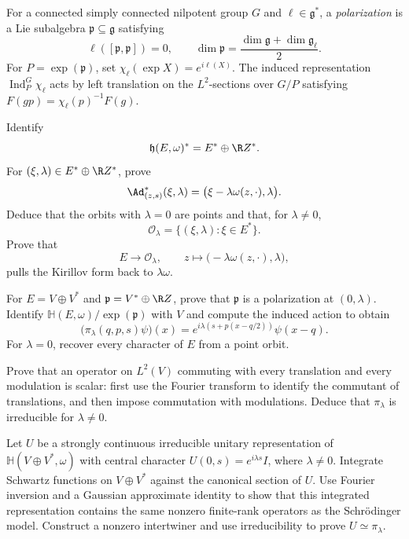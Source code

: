 \begin{exercise}
For a connected simply connected nilpotent group $G$ and
$\ell\in\mathfrak g^*$, a \emph{polarization} is a Lie subalgebra
$\mathfrak p\subseteq\mathfrak g$ satisfying
\[
\ell([\mathfrak p,\mathfrak p])=0,
\qquad
\dim\mathfrak p
=\frac{\dim\mathfrak g+\dim\mathfrak g_\ell}{2}.
\]
For $P=\exp(\mathfrak p)$, set
$\chi_\ell(\exp X)=e^{i\ell(X)}$.  The induced representation
$\operatorname{Ind}_P^G\chi_\ell$ acts by left translation on the
$L^2$-sections over $G/P$ satisfying
$F(gp)=\chi_\ell(p)^{-1}F(g)$.

Identify
\[
\mathfrak h(E,\omega)^*=E^*\oplus\R Z^*.
\]
For $(\xi,\lambda)\in E^*\oplus\R Z^*$, prove
\[
\Ad_{(z,s)}^*(\xi,\lambda)
=\bigl(\xi-\lambda\omega(z,{\cdot}),\lambda\bigr).
\]
Deduce that the orbits with $\lambda=0$ are points and that, for
$\lambda\ne0$,
\[
\mathcal O_\lambda
=\{(\xi,\lambda):\xi\in E^*\}.
\]
Prove that
\[
E\longrightarrow\mathcal O_\lambda,
\qquad
z\longmapsto\bigl(-\lambda\omega(z,{\cdot}),\lambda\bigr),
\]
pulls the Kirillov form back to $\lambda\omega$.

For $E=V\oplus V^*$ and
$\mathfrak p=V^*\oplus\R Z$, prove that $\mathfrak p$ is a polarization
at $(0,\lambda)$.  Identify
$\mathbb H(E,\omega)/\exp(\mathfrak p)$ with $V$ and compute the
induced action to obtain
\[
\bigl(\pi_\lambda(q,p,s)\psi\bigr)(x)
=e^{i\lambda(s+p(x-q/2))}\psi(x-q).
\]
For $\lambda=0$, recover every character of $E$ from a point orbit.
\end{exercise}


\begin{exercise}
Prove that an operator on $L^2(V)$ commuting with every translation and
every modulation is scalar: first use the Fourier transform to identify the
commutant of translations, and then impose commutation with modulations.
Deduce that $\pi_\lambda$ is irreducible for $\lambda\ne0$.
\end{exercise}

\begin{exercise}
Let $U$ be a strongly continuous irreducible unitary representation of
$\mathbb H(V\oplus V^*,\omega)$ with central character
$U(0,s)=e^{i\lambda s}I$, where $\lambda\ne0$.  Integrate Schwartz
functions on $V\oplus V^*$ against the canonical section of $U$.  Use
Fourier inversion and a Gaussian approximate identity to show that this
integrated representation contains the same nonzero finite-rank operators
as the Schr\"odinger model.  Construct a nonzero intertwiner and use
irreducibility to prove $U\simeq\pi_\lambda$.
\end{exercise}

